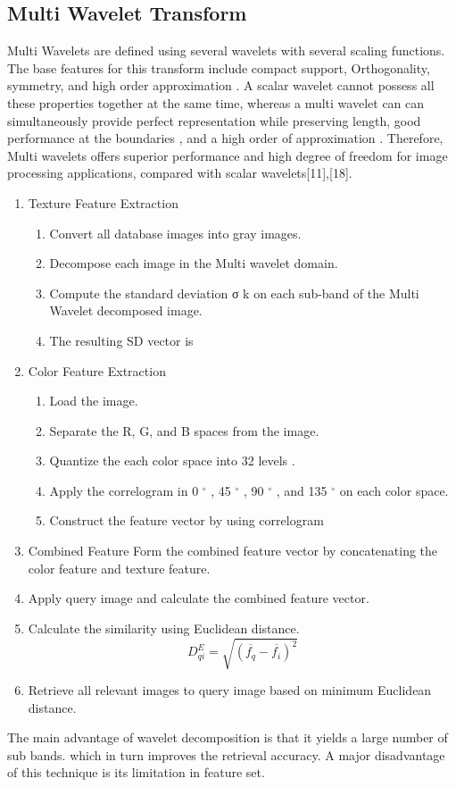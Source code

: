 \subsection[Multi Wavelet Transform]{Multi Wavelet Transform}
Multi Wavelets are defined using several wavelets with several scaling functions. The base
features for this transform include compact support, Orthogonality, symmetry, and high order
approximation . A scalar wavelet cannot possess all these properties together at the same time, whereas a multi wavelet can can simultaneously provide perfect representation while preserving length, good performance at the boundaries , and a high order of approximation . Therefore, Multi wavelets offers superior performance and high degree of freedom for image processing applications, compared with scalar wavelets[11],[18].
\begin{enumerate}
\item Texture Feature Extraction
\begin{enumerate}
\item  Convert all database images into gray images.
 \item Decompose each image in the Multi wavelet domain.
\item  Compute the standard deviation σ k on each sub-band of the Multi Wavelet decomposed
image.
\item  The resulting SD vector is 
 
\end{enumerate}

\item Color Feature Extraction
\begin{enumerate}
\item Load the image.
\item Separate the R, G, and B spaces from the image.
\item Quantize the each color space into 32 levels .
\item Apply the correlogram in 0 $^{\circ}$   , 45 $^{\circ}$  , 90 $^{\circ}$  , and 135 $^{\circ}$  on each color space.

\item Construct the feature vector by using correlogram
\end{enumerate}

\item Combined Feature
Form the combined feature vector by concatenating the color feature and texture feature.
\item Apply query image and calculate the combined feature vector.
\item Calculate the similarity using Euclidean distance.
\begin{equation}
D^{E}_{qi} = \sqrt{\left(\overline{f_q }-\overline{f_i}\right)^2}
\end{equation}
\item Retrieve all relevant images to query image based on minimum Euclidean distance.
\end{enumerate}
The main advantage of wavelet decomposition is that it yields a large number of sub bands. which in turn improves the retrieval accuracy. A major disadvantage of this technique is its limitation in feature set.

